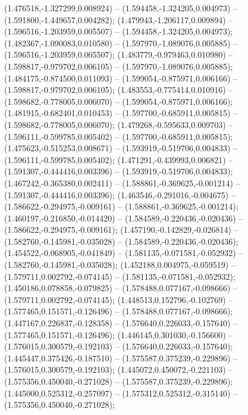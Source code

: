  (1.476518,-1.327299,0.008924) -- (1.594458,-1.324205,0.004973) -- (1.591800,-1.449657,0.004282);
 (1.479943,-1.206117,0.009894) -- (1.596516,-1.203959,0.005507) -- (1.594458,-1.324205,0.004973);
 (1.482367,-1.090083,0.010580) -- (1.597970,-1.089076,0.005885) -- (1.596516,-1.203959,0.005507);
 (1.483779,-0.979463,0.010980) -- (1.598817,-0.979702,0.006105) -- (1.597970,-1.089076,0.005885);
 (1.484175,-0.874500,0.011093) -- (1.599054,-0.875971,0.006166) -- (1.598817,-0.979702,0.006105);
 (1.483553,-0.775414,0.010916) -- (1.598682,-0.778005,0.006070) -- (1.599054,-0.875971,0.006166);
 (1.481915,-0.682401,0.010453) -- (1.597700,-0.685911,0.005815) -- (1.598682,-0.778005,0.006070);
 (1.479268,-0.595633,0.009703) -- (1.596111,-0.599785,0.005402) -- (1.597700,-0.685911,0.005815);
 (1.475623,-0.515253,0.008671) -- (1.593919,-0.519706,0.004833) -- (1.596111,-0.599785,0.005402);
 (1.471291,-0.439993,0.006821) -- (1.591307,-0.444416,0.003396) -- (1.593919,-0.519706,0.004833);
 (1.467242,-0.365380,0.002411) -- (1.588861,-0.369625,-0.001214) -- (1.591307,-0.444416,0.003396);
 (1.463546,-0.291016,-0.004675) -- (1.586622,-0.294975,-0.009161) -- (1.588861,-0.369625,-0.001214);
 (1.460197,-0.216850,-0.014420) -- (1.584589,-0.220436,-0.020436) -- (1.586622,-0.294975,-0.009161);
 (1.457190,-0.142829,-0.026814) -- (1.582760,-0.145981,-0.035028) -- (1.584589,-0.220436,-0.020436);
 (1.454522,-0.068905,-0.041849) -- (1.581135,-0.071581,-0.052932) -- (1.582760,-0.145981,-0.035028);
 (1.452188,0.004975,-0.059519) -- (1.579711,0.002792,-0.074145) -- (1.581135,-0.071581,-0.052932);
 (1.450186,0.078858,-0.079825) -- (1.578488,0.077167,-0.098666) -- (1.579711,0.002792,-0.074145);
 (1.448513,0.152796,-0.102769) -- (1.577465,0.151571,-0.126496) -- (1.578488,0.077167,-0.098666);
 (1.447167,0.226837,-0.128358) -- (1.576640,0.226033,-0.157640) -- (1.577465,0.151571,-0.126496);
 (1.446145,0.301030,-0.156600) -- (1.576015,0.300579,-0.192103) -- (1.576640,0.226033,-0.157640);
 (1.445447,0.375426,-0.187510) -- (1.575587,0.375239,-0.229896) -- (1.576015,0.300579,-0.192103);
 (1.445072,0.450072,-0.221103) -- (1.575356,0.450040,-0.271028) -- (1.575587,0.375239,-0.229896);
 (1.445000,0.525312,-0.257097) -- (1.575312,0.525312,-0.315140) -- (1.575356,0.450040,-0.271028);
